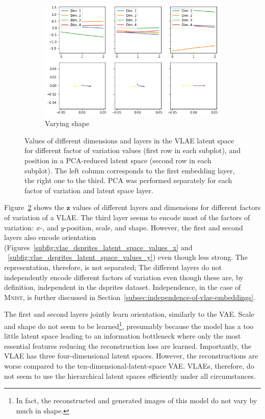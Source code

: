 \begin{figure}
\begin{subfigure}{.48\textwidth}
        \includegraphics[width=\textwidth]{images/latent_space_traversals/vlae_dsprites_shape_latent_space_values.png}
        \caption{Varying shape}
        \label{subfig:vlae_dsprites_latent_space_values_shape}
    \end{subfigure}
    \caption[\ac{VLAE} on dsprites: Latent Space Values]{Values of different dimensions and layers in the \ac{VLAE} latent space for different factor of variation values (first row in each subplot), and position in a \ac{PCA}-reduced latent space (second row in each subplot). The left column corresponds to the first embedding layer, the right one to the third. \ac{PCA} was performed separately for each factor of variation and latent space layer.}
    \label{fig:vlae_dsprites_latent_space_values}
\end{figure}
Figure~\ref{fig:vlae_dsprites_latent_space_values} shows the $\bm{z}$ values of different layers and dimensions for different factors of variation of a \ac{VLAE}.
The third layer seems to encode most of the factors of variation: $x$-, and $y$-position, scale, and shape.
However, the first and second layers also encode orientation (Figures~\ref{subfig:vlae_dsprites_latent_space_values_x} and ~\ref{subfig:vlae_dsprites_latent_space_values_y}) even though less strong.
The representation, therefore, is not separated;
The different layers do not independently encode different factors of variation even though these are, by definition, independent in the dsprites dataset.
Independence, in the case of \textsc{Mnist}, is further discussed in Section~\ref{subsec:independence-of-vlae-embeddings}.

The first and second layers jointly learn orientation, similarly to the \ac{VAE}.
Scale and shape do not seem to be learned\footnote{In fact, the reconstructed and generated images of this model do not vary by much in shape.}, presumably because the model has a too little latent space leading to an information bottleneck where only the most essential features reducing the reconstruction loss are learned.
Importantly, the \ac{VLAE} has three four-dimensional latent spaces.
However, the reconstructions are worse compared to the ten-dimensional-latent-space \ac{VAE}.
\acp{VLAE}, therefore, do not seem to use the hierarchical latent spaces efficiently under all circumstances.

